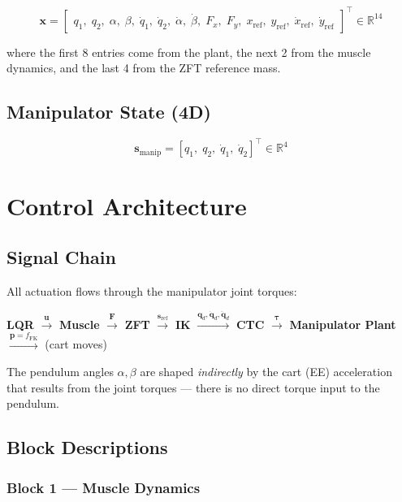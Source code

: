 \documentclass[11pt, a4paper]{article}
\begin{document}
\[
\bm{x} =
\begin{bmatrix}
q_1,\; q_2,\; \alpha,\; \beta,\;
\dot{q}_1,\; \dot{q}_2,\; \dot{\alpha},\; \dot{\beta},\;
F_x,\; F_y,\;
x_{\mathrm{ref}},\; y_{\mathrm{ref}},\;
\dot{x}_{\mathrm{ref}},\; \dot{y}_{\mathrm{ref}}
\end{bmatrix}^{\top} \in \mathbb{R}^{14}
\]

where the first 8 entries come from the plant, the next 2 from the muscle
dynamics, and the last 4 from the ZFT reference mass.

\subsection{Manipulator State (4D)}

\[
\bm{s}_{\text{manip}} =
[q_1,\; q_2,\; \dot{q}_1,\; \dot{q}_2]^{\top} \in \mathbb{R}^{4}
\]

\section{Control Architecture}

\subsection{Signal Chain}

All actuation flows through the manipulator joint torques:

\begin{center}
\textbf{LQR} $\xrightarrow{\bm{u}}$
\textbf{Muscle} $\xrightarrow{\bm{F}}$
\textbf{ZFT} $\xrightarrow{\bm{s}_{\mathrm{ref}}}$
\textbf{IK} $\xrightarrow{\bm{q}_d, \dot{\bm{q}}_d, \ddot{\bm{q}}_d}$
\textbf{CTC} $\xrightarrow{\bm{\tau}}$
\textbf{Manipulator Plant} $\xrightarrow{\bm{p} = f_{\mathrm{FK}}}$ (cart moves)
\end{center}

\noindent The pendulum angles $\alpha, \beta$ are shaped
\emph{indirectly} by the cart (EE) acceleration that results from the joint
torques — there is no direct torque input to the pendulum.

\subsection{Block Descriptions}

\subsubsection*{Block 1 — Muscle Dynamics}
\end{document}
